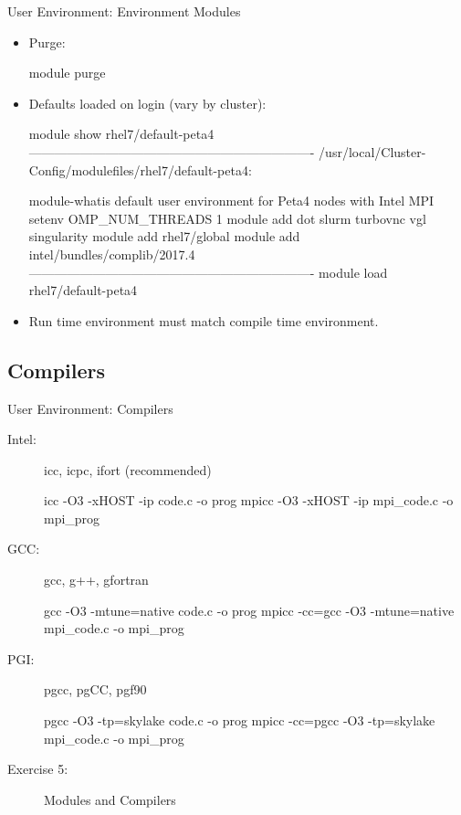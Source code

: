 \begin{frame}[fragile]{User Environment: Environment Modules}
\begin{itemize}
\item{Purge:}
\begin{semiverbatim}
\scriptsize
module purge
\end{semiverbatim}
\smallskip
\item{Defaults loaded on login (vary by cluster):}
\begin{semiverbatim}
\scriptsize
module show rhel7/default-peta4
-------------------------------------------------------------------
/usr/local/Cluster-Config/modulefiles/rhel7/default-peta4:

module-whatis    default user environment for Peta4 nodes with Intel MPI 
setenv           OMP_NUM_THREADS 1 
module           add dot slurm turbovnc vgl singularity 
module           add rhel7/global 
module           add intel/bundles/complib/2017.4 
-------------------------------------------------------------------
module load rhel7/default-peta4
\end{semiverbatim}
\item{\alert{Run time environment must match compile time environment.}}
\end{itemize}
\end{frame}

\subsection{Compilers}
\begin{frame}[fragile]{User Environment: Compilers}
\begin{description}
\item[Intel:]{\alert{icc}, \alert{icpc}, \alert{ifort} (recommended)}
\begin{semiverbatim}
\scriptsize
icc -O3 -xHOST -ip code.c -o prog
mpicc -O3 -xHOST -ip mpi_code.c -o mpi_prog
\end{semiverbatim}
\smallskip
\item[GCC:]{\alert{gcc}, \alert{g++}, \alert{gfortran}}
\begin{semiverbatim}
\scriptsize
gcc -O3 -mtune=native code.c -o prog
mpicc -cc=gcc -O3 -mtune=native mpi_code.c -o mpi_prog
\end{semiverbatim}
\smallskip
\item[PGI:]{\alert{pgcc}, \alert{pgCC}, \alert{pgf90}}
\begin{semiverbatim}
\scriptsize
pgcc -O3 -tp=skylake code.c -o prog
mpicc -cc=pgcc -O3 -tp=skylake mpi_code.c -o mpi_prog
\end{semiverbatim}
\pause
\item[Exercise 5:] Modules and Compilers
\end{description}
\end{frame}


